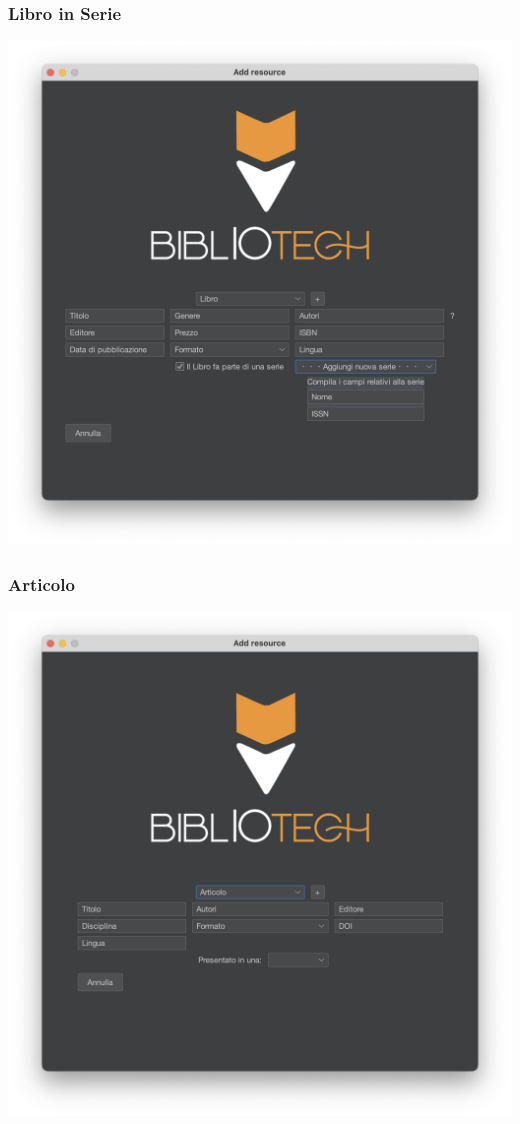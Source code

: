 \subsubsection{Libro in Serie}
\includegraphics[scale=0.25, center]{Immagini/Schermate/Insert/InserisciRisorsaPage-LibroSerie.png}

\subsubsection{Articolo}
\includegraphics[scale=0.25, center]{Immagini/Schermate/Insert/InserisciRisorsaPage-Articolo.png}
